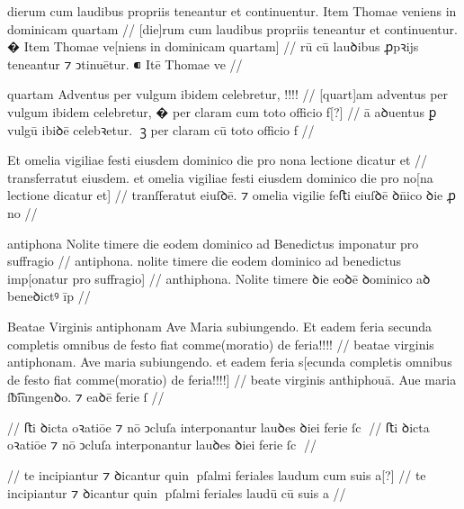 \ex \bg
\gla
{}
dierum cum laudibus propriis teneantur et continuentur.
{} Item Thomae veniens in dominicam quartam
//
\glRekonstrukcja
{}
[die]rum cum laudibus propriis teneantur et continuentur.
� Item Thomae ve[niens in dominicam quartam]
//
\glU
{}
rū cū lauꝺibus ꝓpꝛijs teneantur ⁊ ↄtinuētur. ⁌ Itē Thomae ve   
//
\endgl
\eg


\ex \bg
\gla
{}
quartam Adventus per vulgum
ibidem celebretur, !!!!
//
\glRekonstrukcja
{}
[quart]am adventus per vulgum
ibidem celebretur, � per claram cum toto officio f[?]
//
\glU
{}
ā aꝺuentus ꝑ vulgū ibiꝺē celebꝛetur. ꝫ per claram cū toto oﬀicio f
//
\endgl
\eg




\ex \bg
\gla
{}
{} {}  Et omelia vigiliae festi eiusdem dominico die pro nona
lectione dicatur et 
//
\glRekonstrukcja
{}
transferratut eiusdem. et omelia vigiliae festi eiusdem dominico die pro no[na
lectione dicatur et]
//
\glU
{}
tranſferatut eiuſꝺē. ⁊ omelia vigilie feﬅi eiuſꝺē ꝺn̄ico ꝺie ꝓ no   
//
\endgl
\eg


\ex \bg
\gla
{}
antiphona Nolite timere die eodem dominico ad Benedictus imponatur pro suffragio 
//
\glRekonstrukcja
{}
antiphona. nolite timere die eodem dominico ad benedictus imp[onatur pro suffragio] 
//
\glU
{}
anthiphona. Nolite timere ꝺie eoꝺē ꝺominico aꝺ beneꝺictꝰ īp  
//
\endgl
\eg



\ex \bg
\gla
{}
Beatae Virginis antiphonam Ave Maria
subiungendo. Et eadem feria secunda completis omnibus de festo fiat
comme(moratio) de feria!!!!
//
\glRekonstrukcja
{}
beatae virginis antiphonam. Ave maria
subiungendo. et eadem feria s[ecunda completis omnibus de festo fiat
comme(moratio) de feria!!!!]
//
\glU
{}
beate virginis anthiphouā. Aue maria ſƀ͡iungenꝺo. ⁊ eaꝺē ferie ſ
//
\endgl
\eg



\ex \bg
\gla
{}
{} {} {} {} {} {} {} {} {} {}
{} {} {} {} {} {} {} {} {} {}
//
\glRekonstrukcja
{} ﬅi ꝺicta oꝛatiōe ⁊ nō ↄcluſa interponantur lauꝺes ꝺiei ferie ſc
//
\glU
{}
ﬅi ꝺicta oꝛatiōe ⁊ nō ↄcluſa interponantur lauꝺes ꝺiei ferie ſc
//
\endgl
\eg


\ex \bg
\gla
{}
{} {} {} {} {} {} {} {} {} {}
{} {} {} {} {} {} {} {} {} {}
//
\glRekonstrukcja
{} te incipiantur ⁊ ꝺicantur quin pſalmi feriales laudum cum suis a[?]
//
\glU
{}
te incipiantur ⁊ ꝺicantur quin pſalmi feriales laudū cū suis a
//
\endgl
\eg

